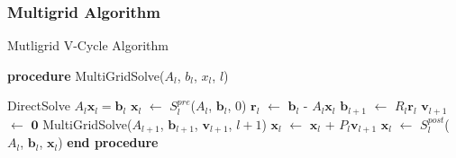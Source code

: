\documentclass[xcolor=pdftex,table,10pt]{beamer}
\begin{document}
    \begin{frame}
        \frametitle{Multigrid Algorithm}

        \begin{block}{Mutligrid V-Cycle Algorithm}
        \begin{algorithmic}[1]
            \STATE \textbf{procedure} MultiGridSolve($A_l$, $b_l$, $x_l$, $l$)

                \STATE DirectSolve $A_l \mathbf{x}_l = \mathbf{b}_l$
            \ELSE
                \STATE $\mathbf{x}_l$ $\leftarrow$ $S^{pre}_l$($A_l$, $\mathbf{b}_l$, $0$)
                \STATE $\mathbf{r}_l$ $\leftarrow$ $\mathbf{b}_l$ - $A_l \mathbf{x}_l$ 
                \STATE $\mathbf{b}_{l+1}$ $\leftarrow$ $R_l \mathbf{r}_l$ 
                \STATE $\mathbf{v}_{l+1}$ $\leftarrow$ $\mathbf{0}$
                \STATE MultiGridSolve($A_{l+1}$, $\mathbf{b}_{l+1}$, $\mathbf{v}_{l+1}$, $l+1$)
                \STATE $\mathbf{x}_l$ $\leftarrow$ $\mathbf{x}_l$ + $P_l \mathbf{v}_{l+1}$ 
                \STATE $\mathbf{x}_l$ $\leftarrow$ $S^{post}_l$($A_l$, $\mathbf{b}_l$, $\mathbf{x}_l$)
            \ENDIF
            \STATE \textbf{end procedure}
        \end{algorithmic}
        \end{block}

    \end{frame}
\end{document}
